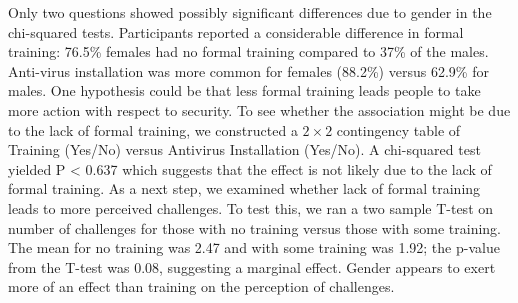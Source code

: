 \begin{table}[tpb]
\caption{Results from Pearson's Chi-Squared test on gender for questions 6 - 13. Columns show $\chi$-squared value, degrees of freedom (df), p value and the category with the largest \% difference between females and males (negative indicates lower value for females. $\alpha<0.05$}
\label{tab:cypreusage}
\end{table}

Only two questions showed possibly significant differences due to gender in the chi-squared tests. Participants reported a considerable difference in formal training: 76.5\% females had no formal training compared to 37\% of the males. Anti-virus installation was more common for females (88.2\%) versus 62.9\% for males. One hypothesis could be that less formal training leads people to take more action with respect to security. To see whether the association might be due to the lack of formal training, we constructed a $2\times 2$ contingency table of Training (Yes/No) versus Antivirus Installation (Yes/No). A chi-squared test yielded P < 0.637 which suggests that the effect is not likely due to the lack of formal training. As a next step, we examined whether lack of formal training leads to more perceived challenges. To test this, we ran a two sample T-test on number of challenges for those with no training versus those with some training. The mean for no training was 2.47 and with some training was 1.92; the p-value from the T-test was 0.08, suggesting a marginal effect. Gender appears to exert more of an effect than training on the perception of challenges.

